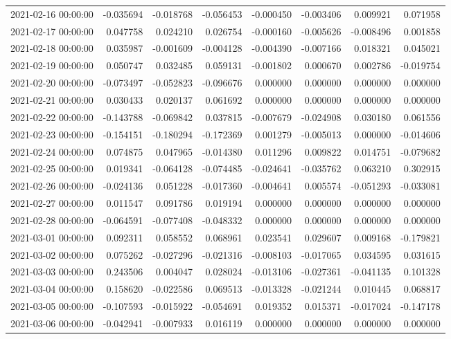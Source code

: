 \begin{tabular}{lrrrrrrr}
2021-02-16 00:00:00 & -0.035694 & -0.018768 & -0.056453 & -0.000450 & -0.003406 & 0.009921 & 0.071958 \\
2021-02-17 00:00:00 & 0.047758 & 0.024210 & 0.026754 & -0.000160 & -0.005626 & -0.008496 & 0.001858 \\
2021-02-18 00:00:00 & 0.035987 & -0.001609 & -0.004128 & -0.004390 & -0.007166 & 0.018321 & 0.045021 \\
2021-02-19 00:00:00 & 0.050747 & 0.032485 & 0.059131 & -0.001802 & 0.000670 & 0.002786 & -0.019754 \\
2021-02-20 00:00:00 & -0.073497 & -0.052823 & -0.096676 & 0.000000 & 0.000000 & 0.000000 & 0.000000 \\
2021-02-21 00:00:00 & 0.030433 & 0.020137 & 0.061692 & 0.000000 & 0.000000 & 0.000000 & 0.000000 \\
2021-02-22 00:00:00 & -0.143788 & -0.069842 & 0.037815 & -0.007679 & -0.024908 & 0.030180 & 0.061556 \\
2021-02-23 00:00:00 & -0.154151 & -0.180294 & -0.172369 & 0.001279 & -0.005013 & 0.000000 & -0.014606 \\
2021-02-24 00:00:00 & 0.074875 & 0.047965 & -0.014380 & 0.011296 & 0.009822 & 0.014751 & -0.079682 \\
2021-02-25 00:00:00 & 0.019341 & -0.064128 & -0.074485 & -0.024641 & -0.035762 & 0.063210 & 0.302915 \\
2021-02-26 00:00:00 & -0.024136 & 0.051228 & -0.017360 & -0.004641 & 0.005574 & -0.051293 & -0.033081 \\
2021-02-27 00:00:00 & 0.011547 & 0.091786 & 0.019194 & 0.000000 & 0.000000 & 0.000000 & 0.000000 \\
2021-02-28 00:00:00 & -0.064591 & -0.077408 & -0.048332 & 0.000000 & 0.000000 & 0.000000 & 0.000000 \\
2021-03-01 00:00:00 & 0.092311 & 0.058552 & 0.068961 & 0.023541 & 0.029607 & 0.009168 & -0.179821 \\
2021-03-02 00:00:00 & 0.075262 & -0.027296 & -0.021316 & -0.008103 & -0.017065 & 0.034595 & 0.031615 \\
2021-03-03 00:00:00 & 0.243506 & 0.004047 & 0.028024 & -0.013106 & -0.027361 & -0.041135 & 0.101328 \\
2021-03-04 00:00:00 & 0.158620 & -0.022586 & 0.069513 & -0.013328 & -0.021244 & 0.010445 & 0.068817 \\
2021-03-05 00:00:00 & -0.107593 & -0.015922 & -0.054691 & 0.019352 & 0.015371 & -0.017024 & -0.147178 \\
2021-03-06 00:00:00 & -0.042941 & -0.007933 & 0.016119 & 0.000000 & 0.000000 & 0.000000 & 0.000000 \\

\end{tabular}
